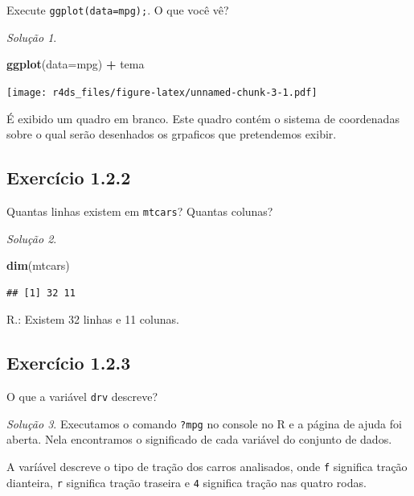 \documentclass[
]{latex/krantz}
\newenvironment{Shaded}{\begin{snugshade}}{\end{snugshade}}
\newcommand{\AttributeTok}[1]{\textcolor[rgb]{0.13,0.29,0.53}{#1}}
\newcommand{\FunctionTok}[1]{\textcolor[rgb]{0.13,0.29,0.53}{\textbf{#1}}}
\newcommand{\NormalTok}[1]{#1}
\newcommand{\SpecialCharTok}[1]{\textcolor[rgb]{0.81,0.36,0.00}{\textbf{#1}}}
\theoremstyle{definition}
\theoremstyle{definition}
\theoremstyle{definition}
\theoremstyle{definition}
\theoremstyle{remark}
\newtheorem*{solution}{Solução}
\begin{document}
Execute \texttt{ggplot(data=mpg);}. O que você vê?

\begin{solution}
\leavevmode

\begin{Shaded}
\begin{Highlighting}[]
\FunctionTok{ggplot}\NormalTok{(}\AttributeTok{data=}\NormalTok{mpg) }\SpecialCharTok{+}
\NormalTok{    tema}
\end{Highlighting}
\end{Shaded}

\texttt{[image: r4ds\_files/figure-latex/unnamed-chunk-3-1.pdf]}

É exibido um quadro em branco. Este quadro contém o sistema de coordenadas sobre o qual serão desenhados os grpaficos que pretendemos exibir.

\end{solution}

\hypertarget{exr1-2-2}{%
\subsection*{Exercício 1.2.2}\label{exr1-2-2}}

Quantas linhas existem em \texttt{mtcars}? Quantas colunas?

\begin{solution}
\leavevmode

\begin{Shaded}
\begin{Highlighting}[]
\FunctionTok{dim}\NormalTok{(mtcars)}
\end{Highlighting}
\end{Shaded}

\begin{verbatim}
## [1] 32 11
\end{verbatim}

R.: Existem 32 linhas e 11 colunas.

\end{solution}

\hypertarget{exr1-2-3}{%
\subsection*{Exercício 1.2.3}\label{exr1-2-3}}

O que a variável \texttt{drv} descreve?

\begin{solution}
Executamos o comando \texttt{?mpg} no console no R e a página de ajuda foi aberta. Nela encontramos o significado de cada variável do conjunto de dados.

A varíável descreve o tipo de tração dos carros analisados, onde \texttt{f} significa tração dianteira, \texttt{r} significa tração traseira e \texttt{4} significa tração nas quatro rodas.
\end{solution}
\end{document}
